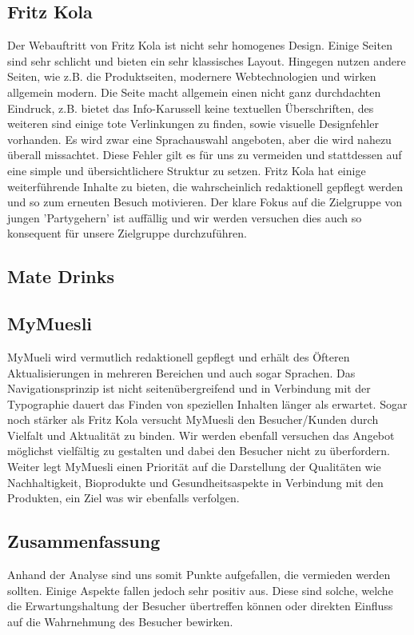 \documentclass[12pt,a4paper,oneside,ngerman]{article}
\begin{document}
\subsection{Fritz Kola} %
Der Webauftritt von Fritz Kola ist nicht sehr homogenes Design. Einige Seiten sind sehr schlicht und bieten ein sehr klassisches Layout. 
Hingegen nutzen andere Seiten, wie z.B. die Produktseiten, modernere Webtechnologien und wirken allgemein modern.
Die Seite macht allgemein einen nicht ganz durchdachten Eindruck, z.B. bietet das Info-Karussell keine textuellen Überschriften, des weiteren sind einige tote Verlinkungen zu finden, sowie visuelle Designfehler vorhanden.
Es wird zwar eine Sprachauswahl angeboten, aber die wird nahezu überall missachtet.
Diese Fehler gilt es für uns zu vermeiden und stattdessen auf eine simple und übersichtlichere Struktur zu setzen.
Fritz Kola hat einige weiterführende Inhalte zu bieten, die wahrscheinlich redaktionell gepflegt werden und so zum erneuten Besuch motivieren.
Der klare Fokus auf die Zielgruppe von jungen 'Partygehern' ist auffällig und wir werden versuchen dies auch so konsequent für unsere Zielgruppe durchzuführen.

\subsection{Mate Drinks} %

\subsection{MyMuesli} %
MyMueli wird vermutlich redaktionell gepflegt und erhält des Öfteren Aktualisierungen in mehreren Bereichen und auch sogar Sprachen. 
Das Navigationsprinzip ist nicht seitenübergreifend und in Verbindung mit der Typographie dauert das Finden von speziellen Inhalten länger als erwartet.
Sogar noch stärker als Fritz Kola versucht MyMuesli den Besucher/Kunden durch Vielfalt und Aktualität zu binden.
Wir werden ebenfall versuchen das Angebot möglichst vielfältig zu gestalten und dabei den Besucher nicht zu überfordern.
Weiter legt MyMuesli einen Priorität auf die Darstellung der Qualitäten wie Nachhaltigkeit, Bioprodukte und Gesundheitsaspekte in Verbindung mit den Produkten, ein Ziel was wir ebenfalls verfolgen.

\subsection{Zusammenfassung}
Anhand der Analyse sind uns somit Punkte aufgefallen, die vermieden werden sollten. Einige Aspekte fallen jedoch sehr positiv aus. Diese sind solche, welche die Erwartungshaltung der Besucher übertreffen können oder direkten Einfluss auf die Wahrnehmung des Besucher bewirken.
\end{document}
